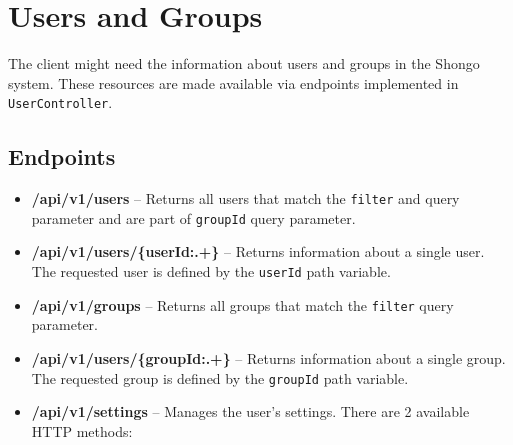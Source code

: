 \section{Users and Groups}
The client might need the information about users and groups in the Shongo system.
These resources are made available via endpoints implemented in \texttt{UserController}.

\subsection{Endpoints}
\begin{itemize}
    \item \textbf{/api/v1/users} -- Returns all users that match the \texttt{filter} and query parameter and are part of \texttt{groupId} query parameter.
    \item \textbf{/api/v1/users/\{userId:.+\}} -- Returns information about a single user. The requested user is defined by the \texttt{userId} path variable.
    \item \textbf{/api/v1/groups} -- Returns all groups that match the \texttt{filter} query parameter.
    \item \textbf{/api/v1/users/\{groupId:.+\}} -- Returns information about a single group. The requested group is defined by the \texttt{groupId} path variable.
    \item \textbf{/api/v1/settings} -- Manages the user's settings. There are 2 available HTTP methods:
\end{itemize}
